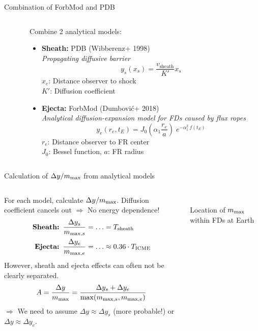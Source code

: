 \documentclass[10pt,aspectratio=169,usenames,dvipsnames]{beamer}
\newcommand{\maxt}{\ensuremath\text{max}}
\begin{document}
\begin{frame}{Combination of ForbMod and PDB}
\begin{columns}
	\begin{column}{0.48\textwidth}
		\centering
		\scalebox{0.8}{}
	\end{column}
	\begin{column}{0.5\textwidth}
		\small
		Combine 2 analytical models:
		\begin{itemize}
			\item \textbf{Sheath:} PDB (Wibberenz+ 1998)\\
			\textit{Propagating diffusive barrier}
			\[y_s(x_s) = \frac{v_\text{sheath}}{K'} x_s\]
			{\footnotesize $x_e$: Distance observer to shock\\ 
				$K'$: Diffusion coefficient}
			\item \textbf{Ejecta:} ForbMod (Dumbović+ 2018)\\
			\textit{Analytical diffusion-expansion model for FDs caused by flux ropes}
			\[y_e(r_e, t_E) = J_0\mathopen{}\left(\alpha_1 \frac{r_e}{a}\right)\mathclose{} \; e^{-\alpha_1^2\ f(t_E)}\]
			{\footnotesize $r_e$: Distance observer to FR center\\
				$J_0$: Bessel function,
				$a$: FR radius}
		\end{itemize}
	\end{column}
\end{columns}

\end{frame}

\begin{frame}{Calculation of $\Delta y/m_\maxt$ from analytical models}
\vskip0.4cm
\begin{columns}
\begin{column}{0.5\textwidth}
	For each model, calculate $\Delta y/m_\maxt$. Diffusion coefficient cancels out $\Rightarrow$ No energy dependence!
	\begin{align*}
	\textbf{Sheath: }\frac{\Delta y_s}{m_{\text{max},s}} &= \ldots = T_\text{sheath}\\
	\textbf{Ejecta: }\frac{\Delta y_e}{m_{\maxt,e}} &= \ldots \approx 0.36 \cdot T_\text{ICME}
	\end{align*}
	However, sheath and ejecta effects can often not be clearly separated.
	\[A = \frac{\Delta y}{m_\maxt} = \frac{\Delta y_s + \Delta y_e}{\max(m_{\maxt,s}, m_{\maxt,e})}\]
	$\Rightarrow$ We need to assume $\Delta y \approx \Delta y_s$ (more probable!) or $\Delta y \approx \Delta y_e$.
\end{column}
\begin{column}{0.48\textwidth}
	\centering
	\scalebox{0.8}{}\\
	Location of $m_\maxt$ within FDs at Earth
\end{column}
\end{columns}
\end{frame}
\end{document}

